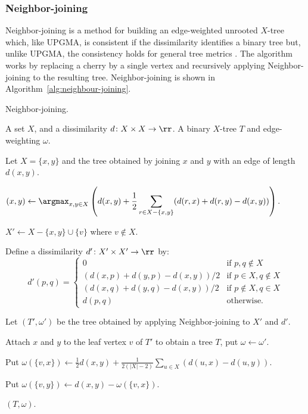 
\subsubsection{Neighbor-joining}
\label{sec:neighbour-joining}

Neighbor-joining is a method for building an edge-weighted unrooted $X$-tree
which, like UPGMA, is consistent if the dissimilarity identifies a binary tree
but, unlike UPGMA, the consistency holds for general tree metrics
\cite{saitou1987nj}.  The algorithm works by replacing a cherry by a single
vertex and recursively applying Neighbor-joining to the resulting tree.
Neighbor-joining is shown in Algorithm~\ref{alg:neighbour-joining}.

\begin{algorithm}[h]
  \caption{Neighbor-joining.}
  \label{alg:neighbour-joining}

  \begin{algorithmic}
    \Require A set $X$, and a dissimilarity $d \colon X \times X \to \rr$.
    \Ensure  A binary $X$-tree $T$ and edge-weighting $\omega$.

     Let $X = \{x,y\}$ and \Return the tree obtained by joining
    $x$ and $y$ with an edge of length $d(x,y)$.
    \EndIf

    \State $\displaystyle (x,y) \gets \argmax_{x,y \in X} \left( d(x,y) + \frac{1}{2}
    \sum_{r \in X - \{x,y\}} (d(r,x)+d(r,y)-d(x,y))\right)$.

    \State $X' \gets X - \{x,y\} \cup \{v\}$ where $v \notin X$.

    \State Define a dissimilarity $d' \colon X' \times X' \to \rr$ by:
    \begin{equation*}
      d'(p,q) =
      \begin{cases}
        0 & \text{if $p,q \notin X$} \\
        (d(x,p)+d(y,p)-d(x,y))/2 & \text{if $p \in X, q \notin X$} \\
        (d(x,q)+d(y,q)-d(x,y))/2 & \text{if $p \notin X, q \in X$} \\
        d(p,q) & \text{otherwise.}
      \end{cases}
    \end{equation*}

    \State Let $(T',\omega')$ be the tree obtained by applying
    Neighbor-joining to $X'$ and $d'$.

    \State Attach $x$ and $y$ to the leaf vertex $v$ of $T'$ to obtain a tree
    $T$, put $\omega \gets \omega'$.

    \State Put $\displaystyle \omega(\{v,x\}) \gets \frac{1}{2} d(x,y) +
    \frac{1}{2(|X|-2)} \sum_{u \in X} (d(u,x)-d(u,y))$.

    \State Put $\omega(\{v,y\}) \gets d(x,y) - \omega(\{v,x\})$.

    \State \Return $(T,\omega)$.
  \end{algorithmic}
\end{algorithm}


